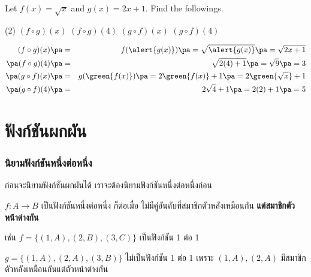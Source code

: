 \begin{frame}[t]
\begin{ex}
Let $f(x) = \sqrt{x} $ and $g(x) = 2x+1$. Find the followings.
\begin{tasks}(2)
\task $(f \circ g)(x)$
\task $(f \circ g)(4)$
\task $(g \circ f)(x)$
\task $(g \circ f)(4)$
\end{tasks}
\end{ex}
\begin{sol}
\begin{eqnarray*}
(f \circ g)(x) \pa &=& f(\alert{g(x)}) \pa= \sqrt{\alert{g(x)}} \pa = \sqrt{2x+1} \\ \pa
(f \circ g)(4) \pa &=& \sqrt{2(4) + 1 } \pa = \sqrt{9} \pa = 3 \\ \pa
(g \circ f)(x) \pa &=& g(\green{f(x)}) \pa = 2\green{f(x)}+1 \pa = 2\green{\sqrt{x}} + 1 \\ \pa
(g \circ f)(4) \pa &=& 2\sqrt{4} + 1 \pa =  2(2) + 1 \pa = 5
\end{eqnarray*}
\end{sol}
\end{frame}

\iffalse
\section{ฟังก์ชันผกผัน}
\frame{\sectionpage}

\begin{frame}
\frametitle{นิยามฟังก์ชันหนึ่งต่อหนึ่ง}
ก่อนจะนิยามฟังก์ชันผกผันได้ เราจะต้องนิยามฟังก์ชันหนึ่งต่อหนึ่งก่อน
\begin{defn}{}{}
$f: A \rightarrow B$ เป็นฟังก์ชันหนึ่งต่อหนึ่ง ก็ต่อเมื่อ ไม่มีคู่อันดับที่สมาชิกตัวหลังเหมือนกัน \textbf{แต่สมาชิกตัวหน้าต่างกัน}
\end{defn} \pa

เช่น $f = \{ (1,A), (2,B), (3,C)\}$ เป็นฟังก์ชัน 1 ต่อ 1 \pa

$g = \{(1,A), (2,A), (3,B)\}$ ไม่เป็นฟังก์ชัน 1 ต่อ 1 เพราะ $(1,A), (2,A)$ มีสมาชิกตัวหลังเหมือนกันแต่ตัวหน้าต่างกัน \pa
\end{frame}

